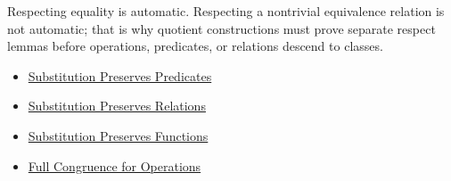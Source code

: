 \begin{remark*}[Interpretation]
Respecting equality is automatic. Respecting a nontrivial equivalence relation
is not automatic; that is why quotient constructions must prove separate
respect lemmas before operations, predicates, or relations descend to classes.
\end{remark*}

\begin{dependencies}
\begin{itemize}
  \item \hyperref[prop:substitution-preserves-predicates]{Substitution Preserves Predicates}
  \item \hyperref[prop:substitution-preserves-relations-full]{Substitution Preserves Relations}
  \item \hyperref[prop:substitution-preserves-functions]{Substitution Preserves Functions}
  \item \hyperref[prop:substitution-preserves-operations-full]{Full Congruence for Operations}
\end{itemize}
\end{dependencies}

